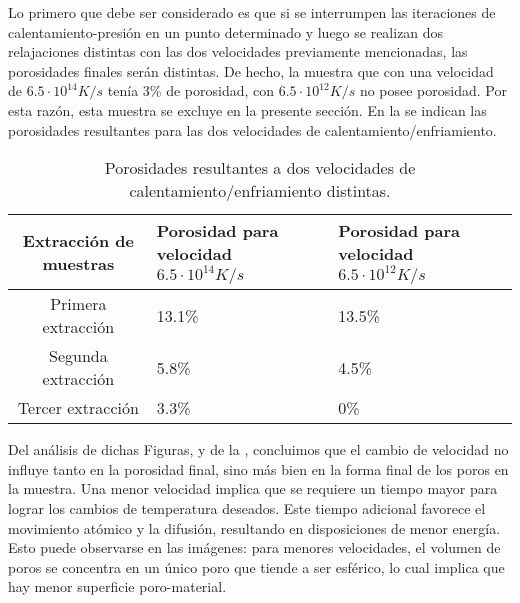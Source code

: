 Lo primero que debe ser considerado es que si se interrumpen las iteraciones de calentamiento-presión en un punto determinado y luego se realizan dos relajaciones distintas con las dos velocidades previamente mencionadas, las porosidades finales serán distintas. De hecho, la muestra que con una velocidad de $6.5 \cdot 10^{14} K/s$ tenía 3\% de porosidad, con $6.5 \cdot 10^{12} K/s$ no posee porosidad. Por esta razón, esta muestra se excluye en la presente sección. En la  se indican las porosidades resultantes para las dos velocidades de calentamiento/enfriamiento.

\begin{table}[htp]
\begin{center}
\begin{tabular}{c C{5cm} C{5cm}}
\hline
\textbf{Extracción de muestras} & \textbf{Porosidad para velocidad $6.5 \cdot 10^{14} K/s$} & \textbf{Porosidad para velocidad $6.5 \cdot 10^{12} K/s$} \\ \hline
\hline
Primera extracción & 13.1\% & 13.5\% \\ \hline
Segunda extracción & 5.8\% & 4.5\% \\ \hline
Tercer extracción & 3.3\% & 0\% \\ \hline
\end{tabular}
\end{center}
\caption[Porosidades resultantes a dos velocidades de calentamiento/enfriamiento distintas]{Porosidades resultantes a dos velocidades de calentamiento/enfriamiento distintas.}
\label{C5:tbl:porosityChange}
\end{table}

 Del análisis de dichas Figuras, y de la , concluimos que el cambio de velocidad no influye tanto en la porosidad final, sino más bien en la forma final de los poros en la muestra. Una menor velocidad implica que se requiere un tiempo mayor para lograr los cambios de temperatura deseados. Este tiempo adicional favorece el movimiento atómico y la difusión, resultando en disposiciones de menor energía. Esto puede observarse en las imágenes: para menores velocidades, el volumen de poros se concentra en un único poro que tiende a ser esférico, lo cual implica que hay menor superficie poro-material.

